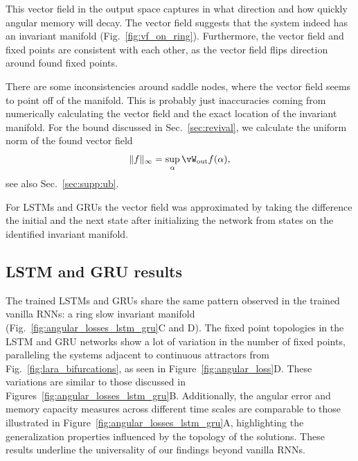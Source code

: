 \documentclass{article} %
\newcounter{ct}
\newcommand{\wout}{\vW_{\text{out}}}
\theoremstyle{definition}
\theoremstyle{remark}
\begin{document}
This vector field in the output space captures in what direction and how quickly angular memory will decay.
 The vector field  suggests that the system indeed has an invariant manifold (Fig.~\ref{fig:vf_on_ring}).
 Furthermore, the vector field and fixed points are consistent with each other, as the vector field flips direction around found fixed points.


 There are some inconsistencies around saddle nodes, where the vector field seems to point off of the manifold.
 This is probably just inaccuracies  coming from numerically calculating the vector field and the exact location of the invariant manifold.
For the bound discussed in Sec.~\ref{sec:revival}, we calculate the uniform norm of the found vector field
\begin{equation}\|f\|_{\infty} = \sup_{\alpha} \wout f(\alpha),\end{equation} see also Sec.~\ref{sec:supp:ub}.

For LSTMs and GRUs the  vector field was approximated by taking the difference the initial and the next state after initializing the network from states on the identified invariant manifold.



\newpage
\subsection{LSTM and GRU results}\label{sec:supp:lstmgru}

The trained LSTMs and GRUs share the same pattern observed in the trained vanilla RNNs: a ring slow invariant manifold (Fig.~\ref{fig:angular_losses_lstm_gru}C and D).
The fixed point topologies in the LSTM and GRU networks show a lot of variation in the number of fixed points, paralleling the systems adjacent to continuous attractors from Fig.~\ref{fig:lara_bifurcations}, as seen in Figure~\ref{fig:angular_loss}D. These variations are similar to those discussed in Figures~\ref{fig:angular_losses_lstm_gru}B.
Additionally, the angular error and memory capacity measures across different time scales are comparable to those illustrated in Figure~\ref{fig:angular_losses_lstm_gru}A, highlighting the generalization properties influenced by the topology of the solutions.
These results underline the universality of our findings beyond vanilla RNNs.
\end{document}
